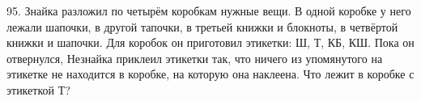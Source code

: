 95. Знайка разложил по четырём коробкам нужные вещи. В одной коробке у него лежали шапочки, в другой тапочки, в третьей книжки и блокноты, в четвёртой книжки и шапочки. Для коробок он приготовил этикетки: Ш, Т, КБ, КШ. Пока он отвернулся, Незнайка приклеил этикетки так, что ничего из упомянутого на этикетке не находится в коробке, на которую она наклеена. Что лежит в коробке с этикеткой Т?\\
